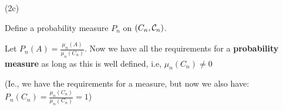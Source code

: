 (2c)

Define a probability measure $P_n$ on $(C_n, \mathcal{C}_n)$.

Let $P_n(A) = \frac{\mu_n(A)}{\mu_n(C_n)}$. Now we have all the requirements for a \textbf{probability measure} as long as this is well defined, i.e, $\mu_n(C_n) \neq 0$

(Ie., we have the requirements for a measure, but now we also have: 
$
P_n(C_n) =
\frac{\mu_n(C_n)}{\mu_n(C_n)} =
1
$)